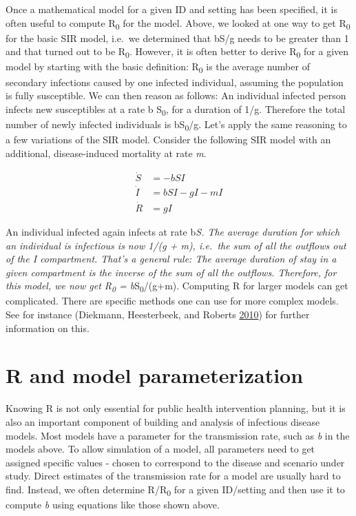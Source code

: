 \documentclass[
]{book}
\begin{document}
Once a mathematical model for a given ID and setting has been specified, it is often useful to compute R\textsubscript{0} for the model. Above, we looked at one way to get R\textsubscript{0} for the basic SIR model, i.e.~we determined that bS/g needs to be greater than 1 and that turned out to be R\textsubscript{0}. However, it is often better to derive R\textsubscript{0} for a given model by starting with the basic definition: R\textsubscript{0} is the average number of secondary infections caused by one infected individual, assuming the population is fully susceptible. We can then reason as follows: An individual infected person infects new susceptibles at a rate b S\textsubscript{0}, for a duration of 1/g. Therefore the total number of newly infected individuals is bS\textsubscript{0}/g. Let's apply the same reasoning to a few variations of the SIR model. Consider the following SIR model with an additional, disease-induced mortality at rate \emph{m}.

\[ 
\begin{aligned}
\dot S &= -b SI \\
\dot I &= b S I - g I - m I\\
\dot R &= g I
\end{aligned}
\]

An individual infected again infects at rate b\emph{S. The average duration for which an individual is infectious is now 1/(g + m), i.e.~the sum of all the outflows out of the \emph{I} compartment. That's a general rule: The average duration of stay in a given compartment is the inverse of the sum of all the outflows. Therefore, for this model, we now get R\textsubscript{0} = b}S\textsubscript{0}/(g+m). Computing R for larger models can get complicated. There are specific methods one can use for more complex models. See for instance (Diekmann, Heesterbeek, and Roberts \protect\hyperlink{ref-diekmann10}{2010}) for further information on this.

\hypertarget{r-and-model-parameterization}{%
\section{R and model parameterization}\label{r-and-model-parameterization}}

Knowing R is not only essential for public health intervention planning, but it is also an important component of building and analysis of infectious disease models. Most models have a parameter for the transmission rate, such as \emph{b} in the models above. To allow simulation of a model, all parameters need to get assigned specific values - chosen to correspond to the disease and scenario under study. Direct estimates of the transmission rate for a model are usually hard to find. Instead, we often determine R/R\textsubscript{0} for a given ID/setting and then use it to compute \emph{b} using equations like those shown above.
\end{document}
